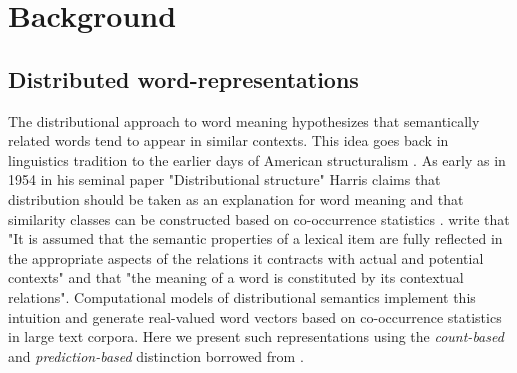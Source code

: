 \begin{comment}
Chapter~\ref{ch:COLI} introduces a recurrent and convolutional neural network
based model that learns from both visual-grounding signals and
word-word co-occurrences. We develop techniques to interpret the learned
representations of such an architecture and investigate if certain linguistic
phenomena is encoded in the learned model.

Chapter~\ref{ch:IJCNLP} provides empirical evidence that grounded learning
can improve machine translation quality.
In Chapter~\ref{ch:ConLL} we show under what conditions multilinguality an help improve grounded
representations.


\end{comment}

\chapter{Background}
\label{ch:background}

\section{Distributed word-representations}
\label{sec:words}
The distributional approach to word meaning hypothesizes that semantically related words
tend to appear in similar contexts. This idea goes back in linguistics tradition to the
earlier days of American structuralism \citep{nevin2002legacy}.
As early as in 1954 in his seminal paper "Distributional structure" Harris claims
that distribution should be taken as an explanation for word meaning and that similarity classes
can be constructed based on co-occurrence statistics \citep{harris1954distributional}.
\cite{cruse1986lexical} write that "It is  assumed  that  the  semantic properties  of
a lexical  item  are  fully  reflected  in  the  appropriate  aspects  of  the  relations
it  contracts  with  actual  and  potential  contexts" and that "the  meaning  of  a word
is constituted  by  its  contextual  relations". Computational models of distributional
semantics implement this intuition and generate real-valued word vectors based on co-occurrence
statistics in large text corpora. Here we present such representations using the \emph{count-based} 
and \emph{prediction-based} distinction borrowed from \cite{baroni2014don}.

